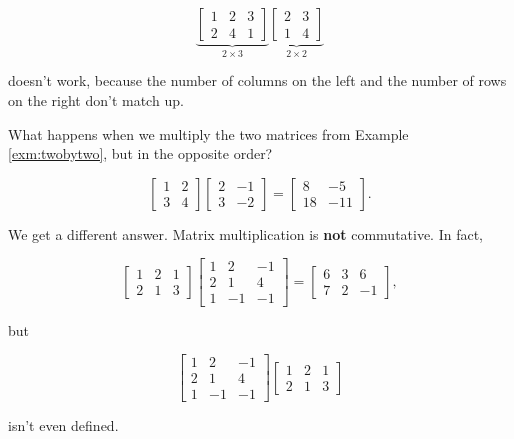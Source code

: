 \documentclass[
]{book}
\theoremstyle{definition}
\theoremstyle{definition}
\theoremstyle{definition}
\theoremstyle{definition}
\theoremstyle{remark}
\begin{document}
\[\underbrace{\begin{bmatrix} 1 & 2 & 3\\2 & 4 & 1\end{bmatrix}}_{2\times 3}\underbrace{\begin{bmatrix} 2& 3\\1 & 4\end{bmatrix}}_{2\times 2}\]

doesn't work, because the number of columns on the left and the number of rows on the right don't match up.

What happens when we multiply the two matrices from Example \ref{exm:twobytwo}, but in the opposite order?

\[\begin{bmatrix}1 & 2\\3 & 4\end{bmatrix}
\begin{bmatrix} 2 & -1 \\ 3 & -2\end{bmatrix} =\begin{bmatrix}
8 & -5 \\18 & -11
\end{bmatrix}.\]

We get a different answer. Matrix multiplication is \textbf{not} commutative. In fact,

\[\begin{bmatrix}
1 & 2 & 1\\2 & 1 & 3\end{bmatrix} \begin{bmatrix}
1 & 2 & -1\\ 2 & 1 & 4 \\1 & -1 & -1
\end{bmatrix}=
\begin{bmatrix}
6 & 3 & 6\\7 & 2 & -1
\end{bmatrix},\]

but

\[\begin{bmatrix}
1 & 2 & -1\\ 2 & 1 & 4 \\1 & -1 & -1
\end{bmatrix}
\begin{bmatrix}
1 & 2 & 1\\2 & 1 & 3\end{bmatrix} \]

isn't even defined.
\end{document}
